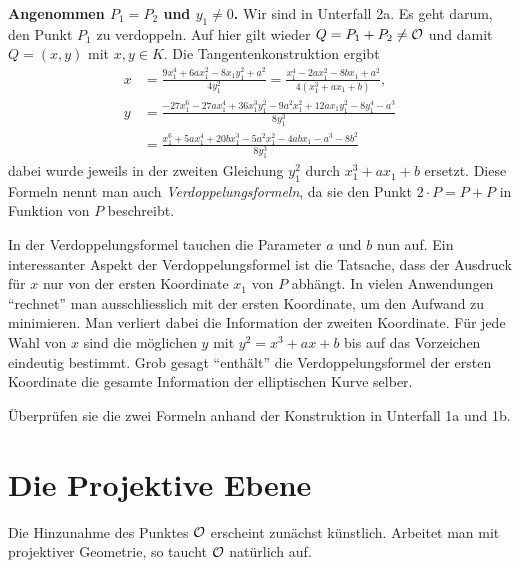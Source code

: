 \bigskip
\textbf{Angenommen $P_1=P_2$ und $y_1\not=0$.} Wir sind in Unterfall
2a. Es geht darum, den Punkt $P_1$ zu verdoppeln. Auf hier gilt wieder
$Q=P_1+P_2\not={\mathcal O}$ und damit $Q=(x,y)$ mit $x,y\in K$.
Die Tangentenkonstruktion ergibt 
\begin{equation}
  \label{eq:dupformula}
  \begin{aligned}
    x &= \frac{9x_1^4+6ax_1^2-8x_1y_1^2+a^2}{4y_1^2} = \frac{x_1^4 - 2ax_1^2 - 8bx_1 + a^2
    }{4(x_1^3+ax_1+b)},\\
    y &=
    \frac{-27x_1^6-27ax_1^4+36x_1^3y_1^2-9a^2x_1^2+12ax_1y_1^2-8y_1^4-a^3}{8y_1^3}\\
    & =\frac{x_1^6+ 5ax_1^4 + 20bx_1^3- 5a^2x_1^2 -4abx_1 -a^3 -8b^2 }{8y_1^3}
  \end{aligned}
\end{equation}
dabei wurde jeweils in der zweiten Gleichung  $y_1^2$ durch
$x_1^3+ax_1+b$ ersetzt.
Diese Formeln nennt man auch
\emph{Verdoppelungsformeln}, da sie den
Punkt $2\cdot P=P+P$ in Funktion von $P$ beschreibt.


In der Verdoppelungsformel tauchen die Parameter $a$ und $b$ nun auf. Ein interessanter
Aspekt der Verdoppelungsformel ist die Tatsache, dass der Ausdruck für
$x$ nur von der ersten Koordinate $x_1$ von $P$ abhängt. In vielen
Anwendungen ``rechnet'' man ausschliesslich mit der ersten Koordinate,
um den Aufwand zu minimieren. Man verliert dabei die Information der
zweiten Koordinate. Für jede Wahl von $x$ sind die möglichen $y$ mit 
$y^2 = x^3+ax+b$ bis auf das Vorzeichen eindeutig bestimmt. Grob
gesagt ``enthält'' die Verdoppelungsformel der ersten Koordinate die
gesamte Information der elliptischen Kurve selber.

\begin{aufgabe}
  Überprüfen sie die zwei Formeln anhand der Konstruktion in Unterfall
  1a und 1b. 
\end{aufgabe}




\section{Die Projektive Ebene}
\label{sec:projektiv}

Die Hinzunahme des Punktes ${\mathcal O}$ erscheint zunächst künstlich.
Arbeitet man mit projektiver Geometrie, so taucht ${\mathcal O}$  natürlich
auf.

